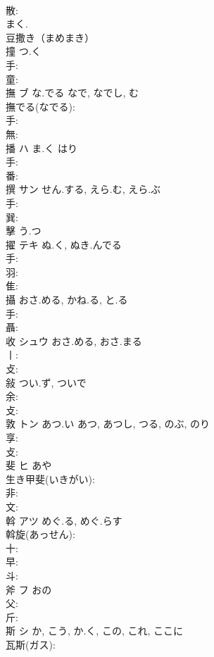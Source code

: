 \documentclass[8pt]{extreport}
\begin{document}
\begin{CJK}{UTF8}{min}
\\	散: 
\\	まく.	
\\	豆撒き（まめまき） 
\\	撞		つ.く				
\\	手: 
\\	童: 
\\	撫	ブ	な.でる	なで, なでし, む	
\\	撫でる(なでる): 
\\	手: 
\\	無: 
\\	播	ハ	ま.く	はり	
\\	手: 
\\	番: 
\\	撰	サン	せん.する, えら.む, えら.ぶ		
\\	手: 
\\	巽: 
\\	擊		う.つ				
\\	擢	テキ	ぬ.く, ぬき.んでる		
\\	手: 
\\	羽: 
\\	隹: 
\\	攝		おさ.める, かね.る, と.る				
\\	手: 
\\	聶: 
\\	收	シュウ	おさ.める, おさ.まる		
\\	丨: 
\\	攴: 
\\	敍		つい.ず, ついで				
\\	余: 
\\	攴: 
\\	敦	トン	あつ.い	あつ, あつし, つる, のぶ, のり	
\\	享: 
\\	攴: 
\\	斐	ヒ		あや	
\\	生き甲斐(いきがい): 
\\	非: 
\\	文: 
\\	斡	アツ	めぐ.る, めぐ.らす		
\\	斡旋(あっせん): 
\\	十: 
\\	早: 
\\	斗: 
\\	斧	フ	おの		
\\	父: 
\\	斤: 
\\	斯	シ	か, こう, か.く, この, これ, ここに		
\\	瓦斯(ガス): 

\end{CJK}
\end{document}
